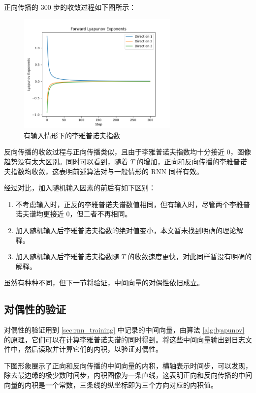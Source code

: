 正向传播的 300 步的收敛过程如下图所示：

\begin{figure}[htbp]
  \centering
  \includegraphics[width=0.7\textwidth]{figures/lyapunov_exponents_forward_with_input.png}
  \caption{有输入情形下的李雅普诺夫指数}
  \label{fig:example}
\end{figure}

反向传播的收敛过程与正向传播类似，且由于李雅普诺夫指数均十分接近 0，图像趋势没有太大区别。同时可以看到，随着 $T$ 的增加，正向和反向传播的李雅普诺夫指数均收敛，这表明前述算法对与一般情形的 RNN 同样有效。

经过对比，加入随机输入因素的前后有如下区别：

\begin{enumerate}
  \item 不考虑输入时，正反的李雅普诺夫谱数值相同，但有输入时，尽管两个李雅普诺夫谱均更接近 0，但二者不再相同。
  \item 加入随机输入后李雅普诺夫指数的绝对值变小，本文暂未找到明确的理论解释。
  \item 加入随机输入后李雅普诺夫指数随 $T$ 的收敛速度更快，对此同样暂没有明确的解释。
\end{enumerate}

虽然有种种不同，但下一节将验证，中间向量的对偶性依旧成立。

\subsection{对偶性的验证}\label{sec:duality}

对偶性的验证用到 \ref{sec:rnn_training} 中记录的中间向量，由算法 \ref{alg:lyapunov} 的原理，它们可以在计算李雅普诺夫谱的同时得到。将这些中间向量输出到日志文件中，然后读取并计算它们的内积，以验证对偶性。

下图形象展示了正向和反向传播的中间向量的内积，横轴表示时间步，可以发现，除去最边缘的极少数时间步，内积图像为一条直线，这表明正向和反向传播的中间向量的内积是一个常数，三条线的纵坐标即为三个方向对应的内积值。

